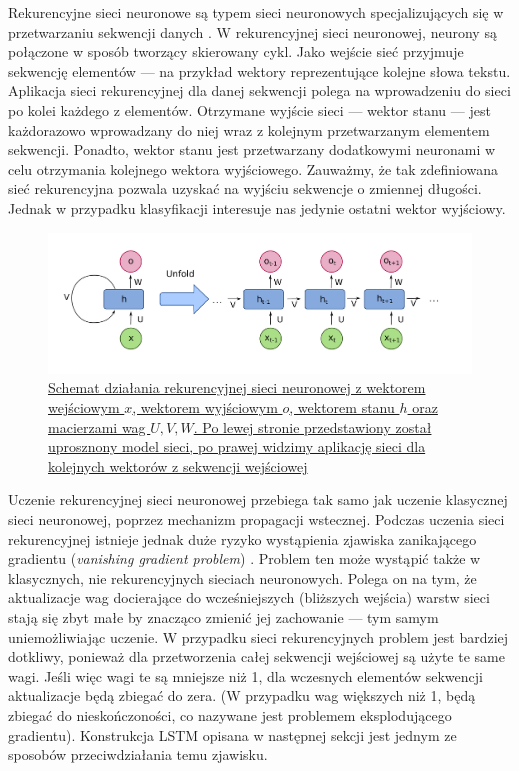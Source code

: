Rekurencyjne sieci neuronowe są typem sieci neuronowych specjalizujących się w przetwarzaniu sekwencji danych \cite{goodfellow2016deep}. 
W rekurencyjnej sieci neuronowej, neurony są połączone w sposób tworzący skierowany cykl. Jako wejście sieć przyjmuje sekwencję elementów --- na przykład wektory reprezentujące kolejne słowa tekstu. Aplikacja sieci rekurencyjnej dla danej sekwencji polega na wprowadzeniu do sieci po kolei każdego z elementów. Otrzymane wyjście sieci --- wektor stanu --- jest każdorazowo wprowadzany do niej wraz z kolejnym przetwarzanym elementem sekwencji. Ponadto, wektor stanu jest przetwarzany dodatkowymi neuronami w celu otrzymania kolejnego wektora wyjściowego. Zauważmy, że tak zdefiniowana sieć rekurencyjna pozwala uzyskać na wyjściu sekwencje o zmiennej długości. Jednak w przypadku klasyfikacji interesuje nas jedynie ostatni wektor wyjściowy.

\begin{figure}[H]
	\centering
	\includegraphics[width=0.95\linewidth]{images/chapter2/rnn.pdf}
	\caption{\href{https://commons.m.wikimedia.org/wiki/Artificial_neural_network} {Schemat działania rekurencyjnej sieci neuronowej z wektorem wejściowym $x$, wektorem wyjściowym $o$, wektorem stanu $h$ oraz macierzami wag $U, V, W$. Po lewej stronie przedstawiony został uprosznony model sieci, po prawej widzimy aplikację sieci dla kolejnych wektorów z sekwencji wejściowej}}
	\label{fig:rnn}
\end{figure}
\noindent Uczenie rekurencyjnej sieci neuronowej przebiega tak samo jak uczenie klasycznej sieci neuronowej, poprzez mechanizm propagacji wstecznej. Podczas uczenia sieci rekurencyjnej istnieje jednak duże ryzyko wystąpienia zjawiska zanikającego gradientu (\textit{vanishing gradient problem}) \cite{hochreiter1997long}. Problem ten może wystąpić także w klasycznych, nie rekurencyjnych sieciach neuronowych. Polega on na tym, że aktualizacje wag docierające do wcześniejszych (bliższych wejścia) warstw sieci stają się zbyt małe by znacząco zmienić jej zachowanie --- tym samym uniemożliwiając uczenie. W przypadku sieci rekurencyjnych problem jest bardziej dotkliwy, ponieważ dla przetworzenia całej sekwencji wejściowej są użyte te same wagi. Jeśli więc wagi te są mniejsze niż 1, dla wczesnych elementów sekwencji aktualizacje będą zbiegać do zera. (W przypadku wag większych niż 1, będą zbiegać do nieskończoności, co nazywane jest problemem eksplodującego gradientu). Konstrukcja LSTM opisana w następnej sekcji jest jednym ze sposobów przeciwdziałania temu zjawisku.

